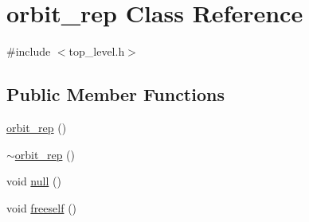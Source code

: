 \hypertarget{classorbit__rep}{}\section{orbit\+\_\+rep Class Reference}
\label{classorbit__rep}


{\ttfamily \#include $<$top\+\_\+level.\+h$>$}

\subsection*{Public Member Functions}
\begin{DoxyCompactItemize}
\item 
\mbox{\hyperlink{classorbit__rep_a78ae6c8440d6ae240f9562cbd7a8b86c}{orbit\+\_\+rep}} ()
\item 
\mbox{\hyperlink{classorbit__rep_a72d5955dc2387f970d3f95511cb87597}{$\sim$orbit\+\_\+rep}} ()
\item 
void \mbox{\hyperlink{classorbit__rep_a19d7c465a835063866de9d537f9409c0}{null}} ()
\item 
void \mbox{\hyperlink{classorbit__rep_a9f638aad2742c3f6ee86a86af4982700}{freeself}} ()
\item 

\end{DoxyCompactItemize}
